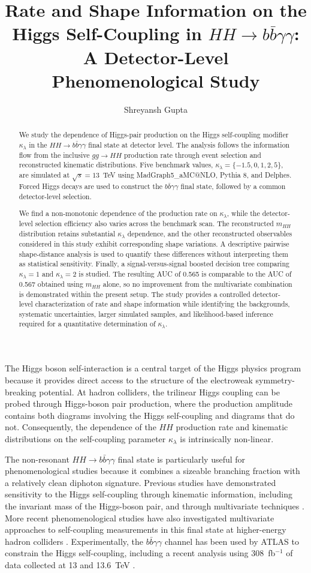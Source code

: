 \documentclass[11pt,a4paper]{article}
\title{Rate and Shape Information on the Higgs Self-Coupling in
$HH\to b\bar b\gamma\gamma$: A Detector-Level Phenomenological Study}
\author{Shreyansh Gupta}
\date{}
\begin{document}
\begin{abstract}
We study the dependence of Higgs-pair production on the Higgs self-coupling modifier $\kappa_\lambda$ in the $HH\to b\bar b\gamma\gamma$ final state at detector level. The analysis follows the information flow from the inclusive $gg\to HH$ production rate through event selection and reconstructed kinematic distributions. Five benchmark values, $\kappa_\lambda=\{-1.5,0,1,2,5\}$, are simulated at $\sqrt{s}=13$~TeV using MadGraph5\_aMC@NLO, Pythia 8, and Delphes. Forced Higgs decays are used to construct the $b\bar b\gamma\gamma$ final state, followed by a common detector-level selection.

We find a non-monotonic dependence of the production rate on $\kappa_\lambda$, while the detector-level selection efficiency also varies across the benchmark scan. The reconstructed $m_{HH}$ distribution retains substantial $\kappa_\lambda$ dependence, and the other reconstructed observables considered in this study exhibit corresponding shape variations. A descriptive pairwise shape-distance analysis is used to quantify these differences without interpreting them as statistical sensitivity. Finally, a signal-versus-signal boosted decision tree comparing $\kappa_\lambda=1$ and $\kappa_\lambda=2$ is studied. The resulting AUC of 0.565 is comparable to the AUC of 0.567 obtained using $m_{HH}$ alone, so no improvement from the multivariate combination is demonstrated within the present setup. The study provides a controlled detector-level characterization of rate and shape information while identifying the backgrounds, systematic uncertainties, larger simulated samples, and likelihood-based inference required for a quantitative determination of $\kappa_\lambda$.
\end{abstract}


The Higgs boson self-interaction is a central target of the Higgs physics program because it provides direct access to the structure of the electroweak symmetry-breaking potential. At hadron colliders, the trilinear Higgs coupling can be probed through Higgs-boson pair production, where the production amplitude contains both diagrams involving the Higgs self-coupling and diagrams that do not. Consequently, the dependence of the $HH$ production rate and kinematic distributions on the self-coupling parameter $\kappa_\lambda$ is intrinsically non-linear.

The non-resonant $HH\to b\bar b\gamma\gamma$ final state is particularly useful for phenomenological studies because it combines a sizeable branching fraction with a relatively clean diphoton signature. Previous studies have demonstrated sensitivity to the Higgs self-coupling through kinematic information, including the invariant mass of the Higgs-boson pair, and through multivariate techniques \cite{Goncalves2018,Alves2017}. More recent phenomenological studies have also investigated multivariate approaches to self-coupling measurements in this final state at higher-energy hadron colliders \cite{Park2020,Adhikary2020}. Experimentally, the $b\bar b\gamma\gamma$ channel has been used by ATLAS to constrain the Higgs self-coupling, including a recent analysis using 308~fb$^{-1}$ of data collected at 13 and 13.6~TeV \cite{ATLAS2025}.
\end{document}
